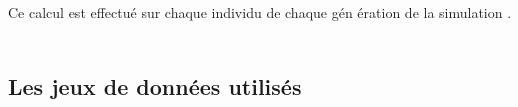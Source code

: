 \documentclass[journal, a4paper]{IEEEtran}
\begin{document}
		Ce calcul est effectué sur chaque individu de chaque gén
		ération de la simulation . \\


	\

	\subsection{Les jeux de données utilisés}\label{subsec:les-jeux-de-donnees-utilises}
\end{document}
